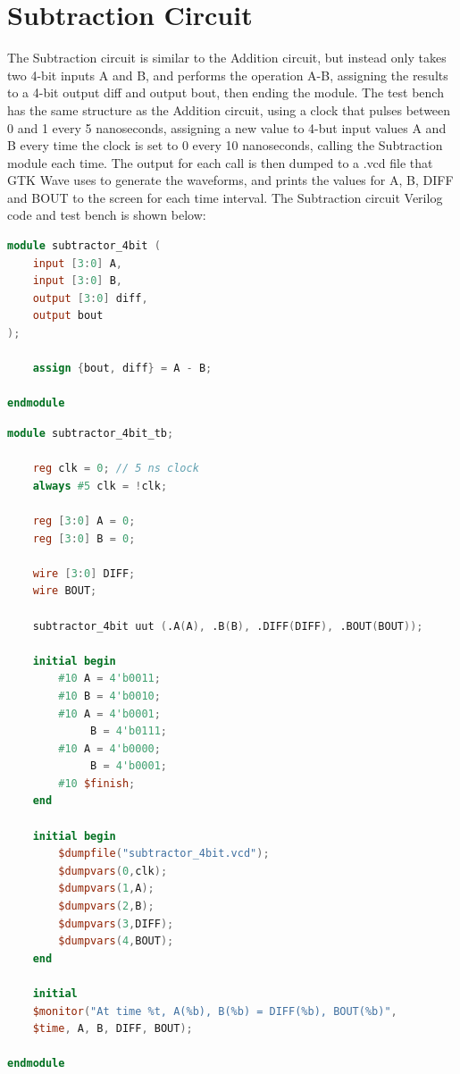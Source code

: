 \documentclass[runningheads, 12pt]{report}
\begin{document}
\section{Subtraction Circuit}

	The Subtraction circuit is similar to the Addition circuit, but instead only takes two 4-bit inputs A and B, and performs the operation A-B, assigning the results to a 4-bit output diff and output bout, then ending the module. The test bench has the same structure as the Addition circuit, using a clock that pulses between 0 and 1 every 5 nanoseconds, assigning a new value to 4-but input values A and B every time the clock is set to 0 every 10 nanoseconds, calling the Subtraction module each time. The output for each call is then dumped to a .vcd file that GTK Wave uses to generate the waveforms, and prints the values for A, B, DIFF and BOUT to the screen for each time interval. The Subtraction circuit Verilog code and test bench is shown below: 


\begin{lstlisting}[language=Verilog, caption={Subtraction Circuit Verilog}]
module subtractor_4bit (
    input [3:0] A,
    input [3:0] B,
    output [3:0] diff,
    output bout
);

    assign {bout, diff} = A - B;

endmodule
\end{lstlisting}
	
\begin{lstlisting}[language=Verilog, caption={Subtraction Circuit Test Bench}]
module subtractor_4bit_tb;

    reg clk = 0; // 5 ns clock
    always #5 clk = !clk;

    reg [3:0] A = 0;
    reg [3:0] B = 0;

    wire [3:0] DIFF;
    wire BOUT;

    subtractor_4bit uut (.A(A), .B(B), .DIFF(DIFF), .BOUT(BOUT));

    initial begin
        #10 A = 4'b0011;
        #10 B = 4'b0010;
        #10 A = 4'b0001;
             B = 4'b0111;
        #10 A = 4'b0000;
             B = 4'b0001;
        #10 $finish;
    end

    initial begin
        $dumpfile("subtractor_4bit.vcd");
        $dumpvars(0,clk);
        $dumpvars(1,A);
        $dumpvars(2,B);
        $dumpvars(3,DIFF);
        $dumpvars(4,BOUT);
    end

    initial 
    $monitor("At time %t, A(%b), B(%b) = DIFF(%b), BOUT(%b)", 
    $time, A, B, DIFF, BOUT);

endmodule
\end{lstlisting}
\end{document}
